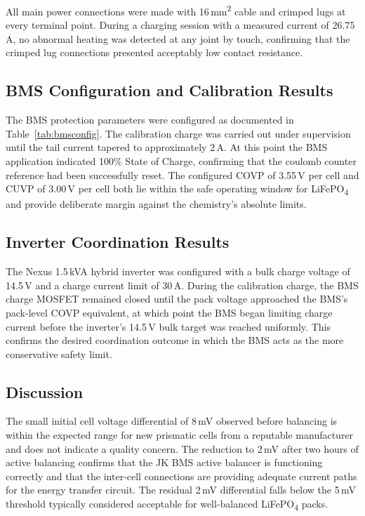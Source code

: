\documentclass[12pt, a4paper]{report}
\begin{document}
{All main power connections were made with 16\,mm\textsuperscript{2} cable
and crimped lugs at every terminal point. During a charging session with
a measured current of 26.75\,A, no abnormal heating was detected at any
joint by touch, confirming that the crimped lug connections presented
acceptably low contact resistance.

\subsection{BMS Configuration and Calibration Results}

The BMS protection parameters were configured as documented in
Table~\ref{tab:bmsconfig}. The calibration charge was carried out under
supervision until the tail current tapered to approximately 2\,A. At this
point the BMS application indicated 100\% State of Charge, confirming
that the coulomb counter reference had been successfully reset. The
configured COVP of 3.55\,V per cell and CUVP of 3.00\,V per cell both
lie within the safe operating window for LiFePO\textsubscript{4} and
provide deliberate margin against the chemistry's absolute limits.

\subsection{Inverter Coordination Results}

The Nexus 1.5\,kVA hybrid inverter was configured with a bulk charge
voltage of 14.5\,V and a charge current limit of 30\,A. During the
calibration charge, the BMS charge MOSFET remained closed until the pack
voltage approached the BMS's pack-level COVP equivalent, at which point
the BMS began limiting charge current before the inverter's 14.5\,V bulk
target was reached uniformly. This confirms the desired coordination
outcome in which the BMS acts as the more conservative safety limit.

\subsection{Discussion}

The small initial cell voltage differential of 8\,mV observed before
balancing is within the expected range for new prismatic cells from a
reputable manufacturer and does not indicate a quality concern. The
reduction to 2\,mV after two hours of active balancing confirms that the
JK BMS active balancer is functioning correctly and that the inter-cell
connections are providing adequate current paths for the energy transfer
circuit. The residual 2\,mV differential falls below the 5\,mV threshold
typically considered acceptable for well-balanced LiFePO\textsubscript{4}
packs.

}
\end{document}

